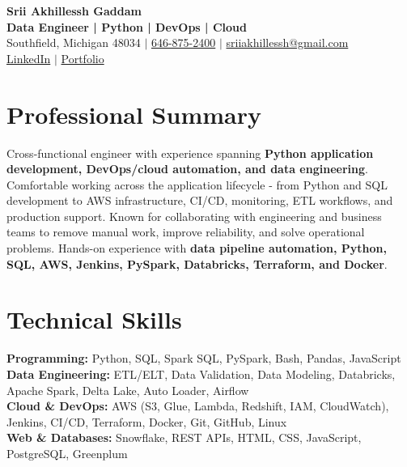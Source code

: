 \documentclass[letterpaper,10pt]{article}
\begin{document}
\fontsize{9.35pt}{10.45pt}\selectfont

\begin{center}
    {\LARGE \textbf{Srii Akhillessh Gaddam}} \\[-1pt]
    \textbf{Data Engineer | Python | DevOps | Cloud} \\[2pt]
    Southfield, Michigan 48034 $|$
    \href{tel:6468752400}{646-875-2400} $|$
    \href{mailto:sriiakhillessh@gmail.com}{sriiakhillessh@gmail.com} \\[1pt]
    \href{https://www.linkedin.com/in/srii-akhiilessh-gaddam-b48668191/}{LinkedIn} $|$
    \href{https://sriiakhillesshg.github.io/portfolio/}{Portfolio}
\end{center}
\vspace{-8pt}

\section{Professional Summary}
\small{Cross-functional engineer with experience spanning \textbf{Python application development, DevOps/cloud automation, and data engineering}. Comfortable working across the application lifecycle - from Python and SQL development to AWS infrastructure, CI/CD, monitoring, ETL workflows, and production support. Known for collaborating with engineering and business teams to remove manual work, improve reliability, and solve operational problems. Hands-on experience with \textbf{data pipeline automation, Python, SQL, AWS, Jenkins, PySpark, Databricks, Terraform, and Docker}.}

\section{Technical Skills}
\small{
\textbf{Programming:} Python, SQL, Spark SQL, PySpark, Bash, Pandas, JavaScript \\
\textbf{Data Engineering:} ETL/ELT, Data Validation, Data Modeling, Databricks, Apache Spark, Delta Lake, Auto Loader, Airflow \\
\textbf{Cloud \& DevOps:} AWS (S3, Glue, Lambda, Redshift, IAM, CloudWatch), Jenkins, CI/CD, Terraform, Docker, Git, GitHub, Linux \\
\textbf{Web \& Databases:} Snowflake, REST APIs, HTML, CSS, JavaScript, PostgreSQL, Greenplum
}

\end{document}
